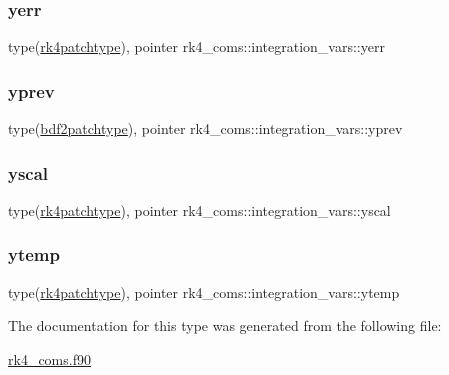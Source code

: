 \subsubsection{\texorpdfstring{yerr}{yerr}}
{\footnotesize\ttfamily type(\hyperlink{structrk4__coms_1_1rk4patchtype}{rk4patchtype}), pointer rk4\+\_\+coms\+::integration\+\_\+vars\+::yerr}

\mbox{\label{structrk4__coms_1_1integration__vars_adba39929ddefffa3c1f201bc49647406}} 
\subsubsection{\texorpdfstring{yprev}{yprev}}
{\footnotesize\ttfamily type(\hyperlink{structrk4__coms_1_1bdf2patchtype}{bdf2patchtype}), pointer rk4\+\_\+coms\+::integration\+\_\+vars\+::yprev}

\mbox{\label{structrk4__coms_1_1integration__vars_ae6e62e452c7a2d6f61027f59c8de3b8c}} 
\subsubsection{\texorpdfstring{yscal}{yscal}}
{\footnotesize\ttfamily type(\hyperlink{structrk4__coms_1_1rk4patchtype}{rk4patchtype}), pointer rk4\+\_\+coms\+::integration\+\_\+vars\+::yscal}

\mbox{\label{structrk4__coms_1_1integration__vars_a65e3efd63a1824510230efa994043c65}} 
\subsubsection{\texorpdfstring{ytemp}{ytemp}}
{\footnotesize\ttfamily type(\hyperlink{structrk4__coms_1_1rk4patchtype}{rk4patchtype}), pointer rk4\+\_\+coms\+::integration\+\_\+vars\+::ytemp}



The documentation for this type was generated from the following file\+:\begin{DoxyCompactItemize}
\item 
\hyperlink{rk4__coms_8f90}{rk4\+\_\+coms.\+f90}\end{DoxyCompactItemize}
